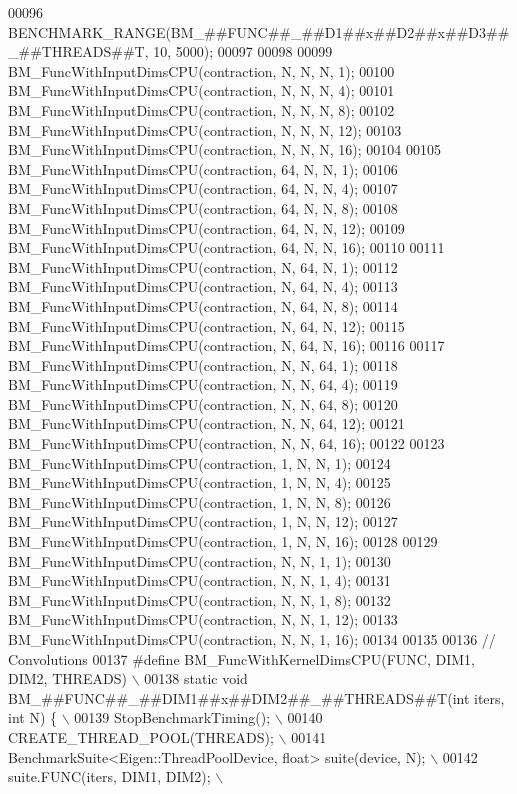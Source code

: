 \begin{DoxyCode}
00096 \textcolor{preprocessor}{  BENCHMARK\_RANGE(BM\_##FUNC##\_##D1##x##D2##x##D3##\_##THREADS##T, 10, 5000);}
00097 
00098 
00099 BM\_FuncWithInputDimsCPU(contraction, N, N, N, 1);
00100 BM\_FuncWithInputDimsCPU(contraction, N, N, N, 4);
00101 BM\_FuncWithInputDimsCPU(contraction, N, N, N, 8);
00102 BM\_FuncWithInputDimsCPU(contraction, N, N, N, 12);
00103 BM\_FuncWithInputDimsCPU(contraction, N, N, N, 16);
00104 
00105 BM\_FuncWithInputDimsCPU(contraction, 64, N, N, 1);
00106 BM\_FuncWithInputDimsCPU(contraction, 64, N, N, 4);
00107 BM\_FuncWithInputDimsCPU(contraction, 64, N, N, 8);
00108 BM\_FuncWithInputDimsCPU(contraction, 64, N, N, 12);
00109 BM\_FuncWithInputDimsCPU(contraction, 64, N, N, 16);
00110 
00111 BM\_FuncWithInputDimsCPU(contraction, N, 64, N, 1);
00112 BM\_FuncWithInputDimsCPU(contraction, N, 64, N, 4);
00113 BM\_FuncWithInputDimsCPU(contraction, N, 64, N, 8);
00114 BM\_FuncWithInputDimsCPU(contraction, N, 64, N, 12);
00115 BM\_FuncWithInputDimsCPU(contraction, N, 64, N, 16);
00116 
00117 BM\_FuncWithInputDimsCPU(contraction, N, N, 64, 1);
00118 BM\_FuncWithInputDimsCPU(contraction, N, N, 64, 4);
00119 BM\_FuncWithInputDimsCPU(contraction, N, N, 64, 8);
00120 BM\_FuncWithInputDimsCPU(contraction, N, N, 64, 12);
00121 BM\_FuncWithInputDimsCPU(contraction, N, N, 64, 16);
00122 
00123 BM\_FuncWithInputDimsCPU(contraction, 1, N, N, 1);
00124 BM\_FuncWithInputDimsCPU(contraction, 1, N, N, 4);
00125 BM\_FuncWithInputDimsCPU(contraction, 1, N, N, 8);
00126 BM\_FuncWithInputDimsCPU(contraction, 1, N, N, 12);
00127 BM\_FuncWithInputDimsCPU(contraction, 1, N, N, 16);
00128 
00129 BM\_FuncWithInputDimsCPU(contraction, N, N, 1, 1);
00130 BM\_FuncWithInputDimsCPU(contraction, N, N, 1, 4);
00131 BM\_FuncWithInputDimsCPU(contraction, N, N, 1, 8);
00132 BM\_FuncWithInputDimsCPU(contraction, N, N, 1, 12);
00133 BM\_FuncWithInputDimsCPU(contraction, N, N, 1, 16);
00134 
00135 
00136 \textcolor{comment}{// Convolutions}
00137 \textcolor{preprocessor}{#define BM\_FuncWithKernelDimsCPU(FUNC, DIM1, DIM2, THREADS)                    \(\backslash\)}
00138 \textcolor{preprocessor}{  static void BM\_##FUNC##\_##DIM1##x##DIM2##\_##THREADS##T(int iters, int N) \{   \(\backslash\)}
00139 \textcolor{preprocessor}{    StopBenchmarkTiming();                                                     \(\backslash\)}
00140 \textcolor{preprocessor}{    CREATE\_THREAD\_POOL(THREADS);                                               \(\backslash\)}
00141 \textcolor{preprocessor}{    BenchmarkSuite<Eigen::ThreadPoolDevice, float> suite(device, N);           \(\backslash\)}
00142 \textcolor{preprocessor}{    suite.FUNC(iters, DIM1, DIM2);                                             \(\backslash\)}

\end{DoxyCode}
